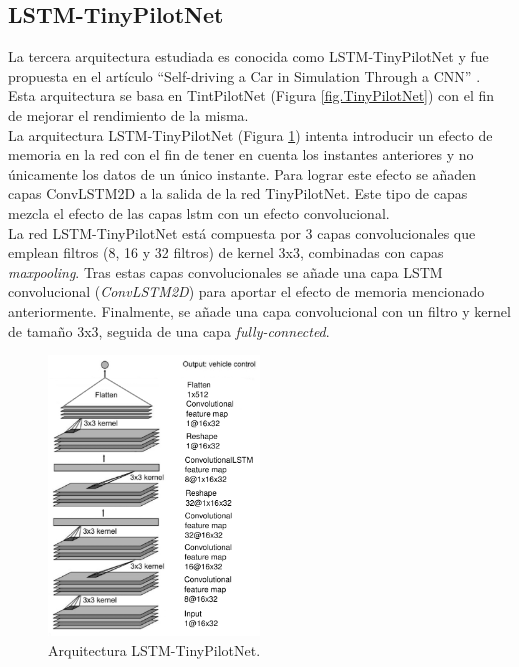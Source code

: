 \subsection{LSTM-TinyPilotNet}

La tercera arquitectura estudiada es conocida como LSTM-TinyPilotNet y fue propuesta en el artículo ``Self-driving a Car in Simulation Through a CNN'' \cite{self-driving}. Esta arquitectura se basa en TintPilotNet (Figura \ref{fig.TinyPilotNet}) con el fin de mejorar el rendimiento de la misma.\\

La arquitectura LSTM-TinyPilotNet (Figura \ref{fig.Lstm_TinyPilotNet}) intenta introducir un efecto de memoria en la red con el fin de tener en cuenta los instantes anteriores y no únicamente los datos de un único instante. Para lograr este efecto se añaden capas ConvLSTM2D a la salida de la red TinyPilotNet. Este tipo de capas mezcla el efecto de las capas \acrshort{lstm} con un efecto convolucional.  \\

La red LSTM-TinyPilotNet está compuesta por 3 capas convolucionales que emplean filtros (8, 16 y 32 filtros) de kernel 3x3, combinadas con capas \textit{maxpooling}. Tras estas capas convolucionales se añade una capa LSTM convolucional (\textit{ConvLSTM2D}) para aportar el efecto de memoria mencionado anteriormente. Finalmente, se añade una capa convolucional con un filtro y kernel de tamaño 3x3, seguida de una capa \textit{fully-connected}.\\

\begin{figure}
\begin{center}
	\includegraphics[width=0.5\textwidth]{figures/Regresion/lstm_tinypilotnet.png}
   \caption{Arquitectura LSTM-TinyPilotNet.}
	\label{fig.Lstm_TinyPilotNet}
\end{center}
\end{figure}



